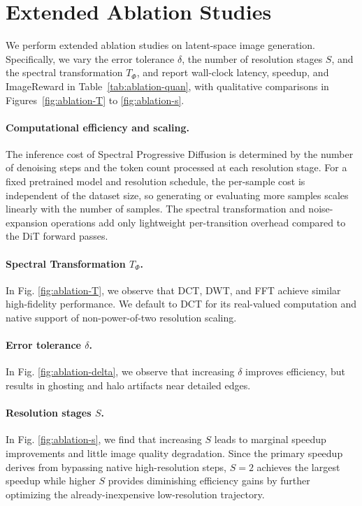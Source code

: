 \section{Extended Ablation Studies}
\label{sec:ablation}

We perform extended ablation studies on latent-space image generation. Specifically, we vary the error tolerance $\delta$, the number of resolution stages $S$, and the spectral transformation $T_\Phi$, and report wall-clock latency, speedup, and ImageReward in Table~\ref{tab:ablation-quan}, with qualitative comparisons in Figures~\ref{fig:ablation-T} to \ref{fig:ablation-s}.



\paragraph{Computational efficiency and scaling.} The inference cost of Spectral Progressive Diffusion is determined by the number of denoising steps and the token count processed at each resolution stage. For a fixed pretrained model and resolution schedule, the per-sample cost is independent of the dataset size, so generating or evaluating more samples scales linearly with the number of samples. The spectral transformation and noise-expansion operations add only lightweight per-transition overhead compared to the DiT forward passes. 

\paragraph{Spectral Transformation $T_\Phi$.} In Fig. \ref{fig:ablation-T}, we observe that DCT, DWT, and FFT achieve similar high-fidelity performance. We default to DCT for its real-valued computation and native support of non-power-of-two resolution scaling.

\paragraph{Error tolerance $\delta$.} In Fig. \ref{fig:ablation-delta}, we observe that increasing $\delta$ improves efficiency, but results in ghosting and halo artifacts near detailed edges.

\paragraph{Resolution stages $S$.} In Fig. \ref{fig:ablation-s}, we find that increasing $S$ leads to marginal speedup improvements and little image quality degradation. Since the primary speedup derives from bypassing native high-resolution steps, $S=2$ achieves the largest speedup while higher $S$ provides diminishing efficiency gains by further optimizing the already-inexpensive low-resolution trajectory.




